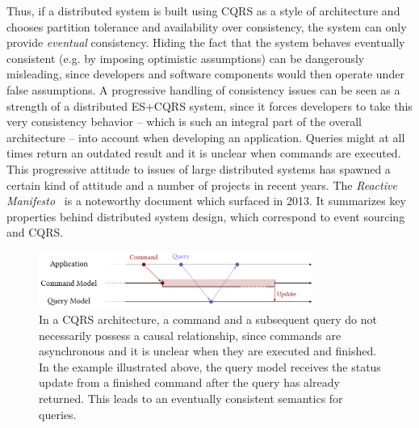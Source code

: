 Thus, if a distributed system is built using CQRS as a style of architecture 
and chooses partition tolerance and availability over consistency, the system 
can only provide \emph{eventual} consistency.
Hiding the fact that the system behaves eventually consistent (e.g. by imposing
optimistic assumptions) can be dangerously misleading, since developers and
software components would then operate under false assumptions.
A progressive handling of consistency issues can be seen as a strength of a
distributed ES+CQRS system, since it forces developers to take this very 
consistency behavior -- which is such an integral part of the overall 
architecture -- into account when developing an application. Queries might at 
all times return an outdated result and it is unclear when commands are 
executed. This progressive attitude to issues of large distributed systems has 
spawned a certain kind of attitude and a number of projects in recent years. 
%
The \emph{Reactive Manifesto}~\cite{Boner2014} is a noteworthy document which 
surfaced in 2013. It summarizes key properties behind distributed system design, 
which correspond to event sourcing and CQRS.

\begin{figure}[t]
	\centering
	\includegraphics[width=0.8\textwidth]
		{../illustrations/causal-series.pdf}

	\caption{
		In a CQRS architecture, a command and a subsequent
		query do not necessarily possess a causal relationship, since 
		commands are asynchronous and it is unclear when they are
		executed and finished. 
		In the example illustrated above, the query model receives the 
		status update from a finished command after the query has
		already returned. This leads to an eventually consistent
		semantics for queries.
	}
	\label{fig:causal-series}
\end{figure}

